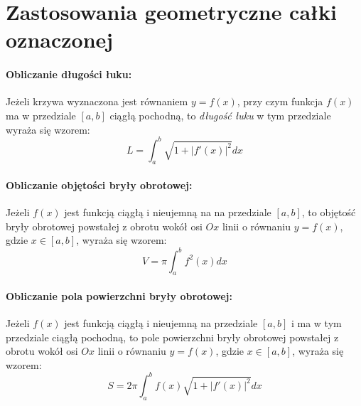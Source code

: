 \documentclass[a4paper,12pt]{book}
\begin{document}
     

\section*{Zastosowania geometryczne całki oznaczonej} 


\paragraph{Obliczanie długości łuku:}
Jeżeli krzywa wyznaczona jest równaniem $y=f(x)$, przy czym \mbox{funkcja}
$f(x)$ ma w przedziale $[a,b]$ ciągłą pochodną, to {\em długość łuku} w tym
przedziale wyraża się wzorem: $$L=\int_{a}^{b}\sqrt{1+|f'(x)|^{2}}dx$$


\paragraph{Obliczanie objętości bryły obrotowej:}
Jeżeli $f(x)$ jest funkcją ciągłą i nieujemną na na przedziale $[a,b]$, to
objętość bryły obrotowej powstałej z obrotu wokół osi $Ox$ linii o równaniu
$y=f(x)$, gdzie $x\in[a,b]$, wyraża się wzorem:
$$V={\pi}\int_{a}^{b}f^{2}(x)dx$$


\paragraph{Obliczanie pola powierzchni bryły obrotowej:}
Jeżeli $f(x)$ jest funkcją ciągłą i nieujemną na przedziale $[a,b]$ i ma w
tym przedziale ciągłą pochodną, to pole powierzchni bryły obrotowej powstałej z
obrotu wokół osi $Ox$ linii o równaniu  $y=f(x)$, gdzie $x \in [a,b]$, wyraża się
wzorem:
$$S=2\pi\int_{a}^{b}f(x)\sqrt{1+|f'(x)|^{2}}dx$$
\end{document}
